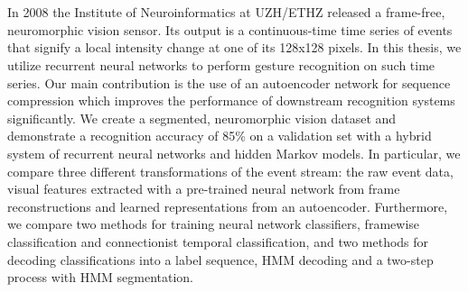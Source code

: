 \chapter{\abstractname}

In 2008 the Institute of Neuroinformatics at UZH/ETHZ released a frame-free,
neuromorphic vision sensor. Its output is a continuous-time time series of
events that signify a local intensity change at one of its 128x128 pixels. In
this thesis, we utilize recurrent neural networks to perform gesture recognition
on such time series. Our main contribution is the use of an autoencoder network
for sequence compression which improves the performance of downstream
recognition systems significantly. We create a segmented, neuromorphic vision
dataset and demonstrate a recognition accuracy of 85\% on a validation set with
a hybrid system of recurrent neural networks and hidden Markov models. In
particular, we compare three different transformations of the event stream: the
raw event data, visual features extracted with a pre-trained neural network from
frame reconstructions and learned representations from an autoencoder.
Furthermore, we compare two methods for training neural network classifiers,
framewise classification and connectionist temporal classification, and two
methods for decoding classifications into a label sequence, HMM decoding and a
two-step process with HMM segmentation.
